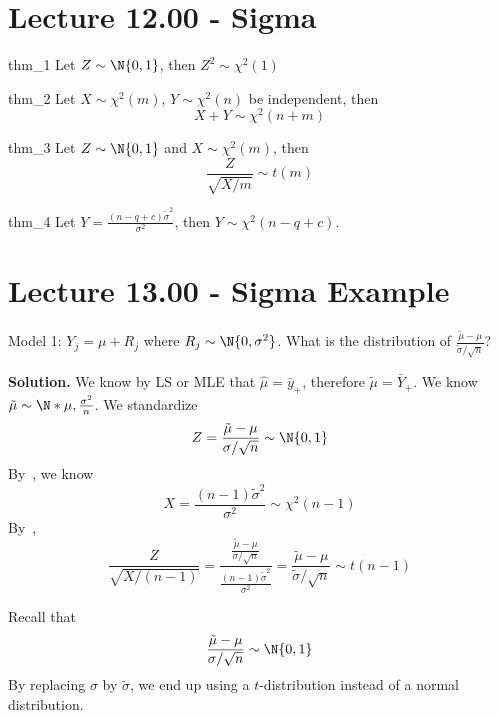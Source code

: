 \section{Lecture 12.00 - Sigma}
\begin{Theorem}{}{thm_1}
    Let $ Z \sim \N{0,1} $, then $ Z^2 \sim \chi^2(1) $
\end{Theorem}
\begin{Theorem}{}{thm_2}
    Let $ X \sim \chi^2(m) $, $ Y \sim \chi^2(n) $
    be independent, then
    \[ X+Y \sim \chi^2(n+m) \]
\end{Theorem}
\begin{Theorem}{}{thm_3}
    Let $ Z \sim \N{0,1} $ and $ X \sim \chi^2(m) $, then
    \[ \frac{Z}{\sqrt{X/m}} \sim t(m) \]
\end{Theorem}
\begin{Theorem}{}{thm_4}
    Let $ \displaystyle Y=\frac{(n-q+c)\tilde{\sigma}^2}{\sigma^2} $,
    then $ Y \sim \chi^2(n-q+c) $.
\end{Theorem}
\section{Lecture 13.00 - Sigma Example}
\begin{Example}{}{}
    Model 1: $ Y_j=\mu+R_j $ where $ R_j \sim \N{0,\sigma^2} $.
    What is the distribution of $ \displaystyle \frac{\tilde{\mu}-\mu}{\tilde{\sigma}/\sqrt{n}} $?

    \textbf{Solution.} We know by LS or MLE that $ \hat{\mu}=\bar{y}_+ $, therefore
    $ \tilde{\mu}=\bar{Y}_+ $. We know $ \tilde{\mu} \sim \N*{\mu,\frac{\sigma^2}{n}} $.
    We standardize
    \[ Z=\frac{\tilde{\mu}-\mu}{\sigma/\sqrt{n}}\sim \N{0,1}  \]
    By~, we know
    \[ X=\frac{(n-1)\tilde{\sigma}^2}{\sigma^2}\sim \chi^2(n-1)  \]
    By~,
    \[ \frac{Z}{\sqrt{X/(n-1)}}
        =\frac{\frac{\tilde{\mu}-\mu}{\sigma/\sqrt{n}}}{\frac{(n-1)\tilde{\sigma}^2}{\sigma^2}}=
        \frac{\tilde{\mu}-\mu}{\tilde{\sigma}/\sqrt{n}}\sim t(n-1)   \]
\end{Example}
\begin{Remark}{}{}
    Recall that
    \[ \frac{\tilde{\mu}-\mu}{\sigma/\sqrt{n}}\sim \N{0,1}  \]
    By replacing $ \sigma $ by $ \tilde{\sigma} $, we end up using a $ t $-distribution
    instead of a normal distribution.
\end{Remark}
